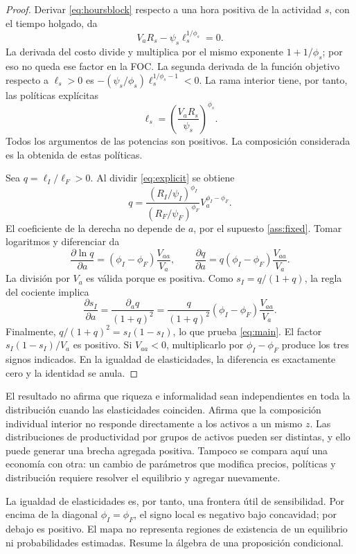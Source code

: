 \documentclass[11pt]{article}
\theoremstyle{definition}
\newcommand{\Va}{V_a}
\newcommand{\Vaa}{V_{aa}}
\newcommand{\sI}{s_I}
\begin{document}
\begin{proof}
Derivar \eqref{eq:hoursblock} respecto a una hora positiva de la actividad \(s\), con el tiempo holgado, da
\[
\Va R_s-\psi_s\ell_s^{1/\phi_s}=0.
\]
La derivada del costo divide y multiplica por el mismo exponente \(1+1/\phi_s\); por eso no queda ese factor en la FOC. La segunda derivada de la función objetivo respecto a \(\ell_s>0\) es
\(-(\psi_s/\phi_s)\ell_s^{1/\phi_s-1}<0\). La rama interior tiene, por tanto, las políticas explícitas
\begin{equation}\label{eq:explicit}
\ell_s=\left(\frac{\Va R_s}{\psi_s}\right)^{\phi_s}.
\end{equation}
Todos los argumentos de las potencias son positivos. La composición considerada es la obtenida de estas políticas.

Sea \(q=\ell_I/\ell_F>0\). Al dividir \eqref{eq:explicit} se obtiene
\[
q=\frac{(R_I/\psi_I)^{\phi_I}}{(R_F/\psi_F)^{\phi_F}}
\Va^{\phi_I-\phi_F}.
\]
El coeficiente de la derecha no depende de \(a\), por el supuesto \ref{ass:fixed}. Tomar logaritmos y diferenciar da
\[
\frac{\partial\ln q}{\partial a}
=(\phi_I-\phi_F)\frac{\Vaa}{\Va},
\qquad
\frac{\partial q}{\partial a}
=q(\phi_I-\phi_F)\frac{\Vaa}{\Va}.
\]
La división por \(\Va\) es válida porque es positiva. Como
\(\sI=q/(1+q)\), la regla del cociente implica
\[
\frac{\partial\sI}{\partial a}
=\frac{\partial_aq}{(1+q)^2}
=\frac{q}{(1+q)^2}(\phi_I-\phi_F)\frac{\Vaa}{\Va}.
\]
Finalmente, \(q/(1+q)^2=\sI(1-\sI)\), lo que prueba \eqref{eq:main}. El factor \(\sI(1-\sI)/\Va\) es positivo. Si \(\Vaa<0\), multiplicarlo por \(\phi_I-\phi_F\) produce los tres signos indicados. En la igualdad de elasticidades, la diferencia es exactamente cero y la identidad se anula.
\end{proof}

El resultado no afirma que riqueza e informalidad sean independientes en toda la distribución cuando las elasticidades coinciden. Afirma que la composición individual interior no responde directamente a los activos a un mismo \(z\). Las distribuciones de productividad por grupos de activos pueden ser distintas, y ello puede generar una brecha agregada positiva. Tampoco se compara aquí una economía con otra: un cambio de parámetros que modifica precios, políticas y distribución requiere resolver el equilibrio y agregar nuevamente.

La igualdad de elasticidades es, por tanto, una frontera útil de sensibilidad. Por encima de la diagonal \(\phi_I=\phi_F\), el signo local es negativo bajo concavidad; por debajo es positivo. El mapa no representa regiones de existencia de un equilibrio ni probabilidades estimadas. Resume la álgebra de una proposición condicional.
\end{document}
